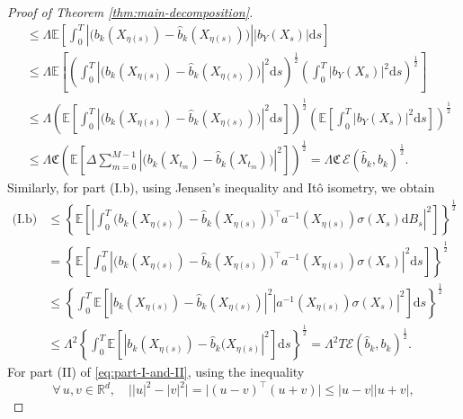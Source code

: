 \documentclass{article}
\theoremstyle{plain}
\theoremstyle{definition}
\theoremstyle{remark}
\renewcommand{\d}{\mathrm{d}}
\newcommand{\RD}{\mathbb{R}^{d}}
\newcommand{\EE}{\mathbb{E}}
\newcommand{\calE}{\mathcal{E}}
\begin{document}
\begin{proof}[Proof of Theorem \ref{thm:main-decomposition}]
\begin{align}
    &\leq \Lambda\EE \left[\int_{0}^T \left|\big( b_k(X_{\eta(s)})-\widehat b_k(X_{\eta(s)})\big)\right| \left|b_Y(X_s) \right|\d s \right]\nonumber\\
    &\leq \Lambda\EE \left[\left(\int_{0}^T \left|\big( b_k(X_{\eta(s)})-\widehat b_k(X_{\eta(s)})\big)\right|^2\d s\right)^{\frac{1}{2}}\left(\int_{0}^T\left|b_Y(X_s) \right|^2\d s\right)^{\frac{1}{2}} \right]\nonumber\\
    &\leq \Lambda \left(\EE \left[\int_{0}^T \left|\big( b_k(X_{\eta(s)})-\widehat b_k(X_{\eta(s)})\big)\right|^2\d s\right]\right)^{\frac{1}{2}}\left(\EE \left[\int_{0}^T\left|b_Y(X_s) \right|^2\d s \right]\right)^{\frac{1}{2}}\nonumber\\
    &\leq \Lambda \mathfrak{C}\left(\EE \left[\Delta\sum_{m=0}^{M-1}\left|\big( b_k(X_{t_m})-\widehat b_k(X_{t_m})\big)\right|^2\right]\right)^{\frac{1}{2}}=\Lambda \mathfrak{C}\,  \calE(\widehat b_k, b_k)^{\frac{1}{2}}.
\end{align}
Similarly, for part (I.b), using Jensen's inequality and It\^o isometry, we obtain
\begin{align}\label{eq:I-b}
\text{(I.b)}&\leq \left\{    \EE \left[\left|\int_{0}^T \big( b_k(X_{\eta(s)})-\widehat b_k(X_{\eta(s)})\big)^{\top}a^{-1}(X_{\eta(s)})\sigma(X_s) \d B_s \right|^2\right]\right\}^{\frac{1}{2}}\nonumber\\
&=\left\{    \EE \left[\int_{0}^T \left|\big( b_k(X_{\eta(s)})-\widehat b_k(X_{\eta(s)})\big)^{\top}a^{-1}(X_{\eta(s)})\sigma(X_s)\right|^2 \d s \right]\right\}^{\frac{1}{2}}\nonumber\\
&\leq \left\{    \int_{0}^T \EE \left[\left| b_k(X_{\eta(s)})-\widehat b_k(X_{\eta(s)})\right|^2\left|a^{-1}(X_{\eta(s)})\sigma(X_s)\right|^2 \right]\d s \right\}^{\frac{1}{2}}\nonumber\\
&\leq \Lambda^2 \left\{    \int_{0}^T \EE \left[\left| b_k(X_{\eta(s)})-\widehat b_k(X_{\eta(s)}\right|^2\right]\d s \right\}^{\frac{1}{2}} = \Lambda^2  T \calE(\widehat b_k, b_k)^{\frac{1}{2}}. 
\end{align}
For part (II) of \eqref{eq:part-I-and-II}, using the inequality \[\forall\,u, v\in\RD, \quad \big||u|^2-|v|^2\big|=\big|(u-v)^{\top}(u+v)\big|\leq |u-v||u+v| ,\] 

\end{proof}
\end{document}
